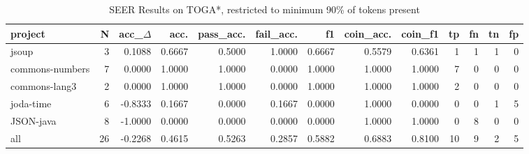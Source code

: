 \begin{table*}
\centering
\caption{SEER Results on TOGA*, restricted to minimum 90\% of tokens present}
\label{tab:toga_results_10}
\begin{tabular}{lrrrrrrrrrrrr}
\toprule
         project &   N &  acc\_$\Delta$ &    acc. &  pass\_acc. &  fail\_acc. &      f1 &  coin\_acc. &  coin\_f1 &  tp &  fn &  tn &  fp \\
\midrule
           jsoup &   3 &      0.1088 &  0.6667 &     0.5000 &     1.0000 &  0.6667 &     0.5579 &   0.6361 &   1 &   1 &   1 &   0 \\
 commons-numbers &   7 &      0.0000 &  1.0000 &     1.0000 &     0.0000 &  1.0000 &     1.0000 &   1.0000 &   7 &   0 &   0 &   0 \\
   commons-lang3 &   2 &      0.0000 &  1.0000 &     1.0000 &     0.0000 &  1.0000 &     1.0000 &   1.0000 &   2 &   0 &   0 &   0 \\
       joda-time &   6 &     -0.8333 &  0.1667 &     0.0000 &     0.1667 &  0.0000 &     1.0000 &   0.0000 &   0 &   0 &   1 &   5 \\
       JSON-java &   8 &     -1.0000 &  0.0000 &     0.0000 &     0.0000 &  0.0000 &     1.0000 &   1.0000 &   0 &   8 &   0 &   0 \\
             all &  26 &     -0.2268 &  0.4615 &     0.5263 &     0.2857 &  0.5882 &     0.6883 &   0.8100 &  10 &   9 &   2 &   5 \\
\bottomrule
\end{tabular}
\end{table*}
